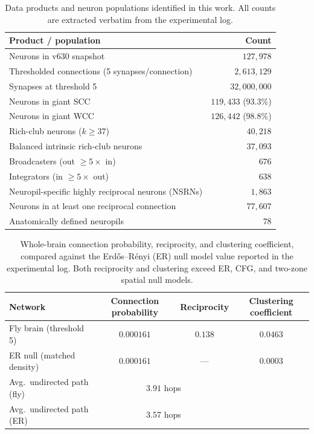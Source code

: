 \documentclass[11pt]{article}
\begin{document}
\begin{table}[htbp]
\centering
\caption{Data products and neuron populations identified in this work.
All counts are extracted verbatim from the experimental log.}
\label{tab:products}
\begin{tabular}{lr}
\toprule
Product / population & Count \\
\midrule
Neurons in v630 snapshot & $127{,}978$ \\
Thresholded connections (5 synapses/connection) & $2{,}613{,}129$ \\
Synapses at threshold 5 & $32{,}000{,}000$ \\
Neurons in giant SCC & $119{,}433$ (93.3\%) \\
Neurons in giant WCC & $126{,}442$ (98.8\%) \\
Rich-club neurons ($k \geq 37$) & $40{,}218$ \\
Balanced intrinsic rich-club neurons & $37{,}093$ \\
Broadcasters (out $\geq 5\times$ in) & $676$ \\
Integrators (in $\geq 5\times$ out) & $638$ \\
Neuropil-specific highly reciprocal neurons (NSRNs) & $1{,}863$ \\
Neurons in at least one reciprocal connection & $77{,}607$ \\
Anatomically defined neuropils & $78$ \\
\bottomrule
\end{tabular}
\end{table}

\begin{table}[htbp]
\centering
\caption{Whole-brain connection probability, reciprocity, and clustering
coefficient, compared against the Erd{\H o}s--R{\'e}nyi (ER) null model
value reported in the experimental log. Both reciprocity and clustering
exceed ER, CFG, and two-zone spatial null models.}
\label{tab:stats}
\begin{tabular}{lccc}
\toprule
Network & Connection probability & Reciprocity & Clustering coefficient \\
\midrule
Fly brain (threshold 5) & $0.000161$ & $0.138$ & $0.0463$ \\
ER null (matched density) & $0.000161$ & --- & $0.0003$ \\
Avg.\ undirected path (fly) & \multicolumn{2}{c}{$3.91$ hops} & \\
Avg.\ undirected path (ER) & \multicolumn{2}{c}{$3.57$ hops} & \\
\bottomrule
\end{tabular}
\end{table}
\end{document}
